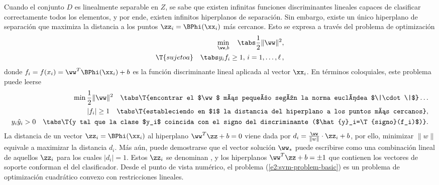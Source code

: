 Cuando el conjunto $D$ es linealmente separable en $Z$, se sabe que
existen infinitas funciones discriminantes lineales capaces de
clasificar correctamente todos los elementos, y por ende, existen
infinitos hiperplanos de separación.  Sin embargo, existe un único
hiperplano de separación  que maximiza la distancia a los
puntos $\zz_i=\BPhi(\xx_i)$ más cercanos.  Esto se expresa a través del
problema de optimización
%
\begin{align}\label{e2:svm-problem-basic}
  \begin{split}
    \min_{\ww,b} \quad\tabs \frac{1}{2}\|\ww\|^2, \\
    \T{sujeto a}\quad\tabs y_i f_i\geq1,\,i=1,\ldots,\ell\,, 
  \end{split}
\end{align}
%
donde $f_i=f(x_i)=\ww^T\BPhi(\xx_i)+b$ es la función discriminante
lineal aplicada al vector $\xx_i$. En términos coloquiales, este
problema puede leerse
%
\begin{align*}
  \begin{split}
    \min \frac{1}{2}\|\ww\|^2 \quad \tabs \T{encontrar el $\ww$ más
      pequeño según la norma euclídea $\|\cdot\|$}\ldots\\
    |f_i|\geq1 \quad \tabs \T{estableciendo en $1$ la distancia del
      hiperplano a los puntos más cercanos},\\
    y_i\hat{y}_i>0\quad \tabs \T{y tal que la clase $y_i$ coincida con el
      signo del discriminante ($\hat{y}_i=\T{signo}(f_i)$)}.
  \end{split}
\end{align*}
%
La distancia de un vector $\zz_i=\BPhi(\xx_i)$ al hiperplano
$\ww^T\zz+b=0$ viene dada por $d_i=\frac{\ww}{\|w\|}\cdot\zz_i+b$, por
ello, minimizar $\|w\|$ equivale a maximizar la distancia $d_i$.  Más
aún, puede demostrarse que el vector solución $\ww_*$ puede escribirse
como una combinación lineal de aquellos $\zz_i$ para los cuales
$|d_i|=1$.  Estos $\zz_i$ se denominan , y los
hiperplanos $\ww^T\zz+b=\pm1$ que contienen los vectores de soporte
conforman el  del clasificador.
Desde el punto de vista numérico, el problema
(\ref{e2:svm-problem-basic}) es un problema de optimización cuadrático
convexo con restricciones lineales.
%
%
